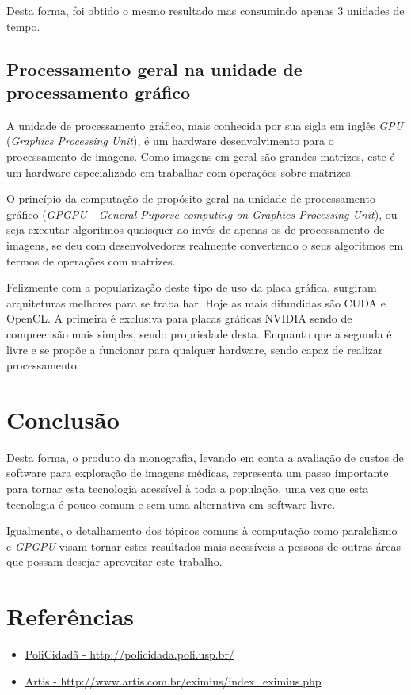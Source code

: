     Desta forma, foi obtido o mesmo resultado mas consumindo apenas 3 unidades de tempo.
  
  \subsection{Processamento geral na unidade de processamento gráfico}
  A unidade de processamento gráfico, mais conhecida por sua sigla em inglês \textit{GPU} (\textit{Graphics Processing Unit}), é um hardware desenvolvimento para o processamento de imagens. Como imagens em geral são grandes matrizes, este é um hardware especializado em trabalhar com operações sobre matrizes.
  
  O princípio da computação de propósito geral na unidade de processamento gráfico (\textit{GPGPU - General Puporse computing on Graphics Processing Unit}), ou seja executar algoritmos quaisquer ao invés de apenas os de processamento de imagens, se deu com desenvolvedores realmente convertendo o seus algoritmos em termos de operações com matrizes.
  
  Felizmente com a popularização deste tipo de uso da placa gráfica, surgiram arquiteturas melhores para se trabalhar. Hoje as mais difundidas são CUDA e OpenCL. A primeira é exclusiva para placas gráficas NVIDIA sendo de compreensão mais simples, sendo propriedade desta. Enquanto que a segunda é livre e se propõe a funcionar para qualquer hardware, sendo capaz de realizar processamento.

\section{Conclusão}
Desta forma, o produto da monografia, levando em conta a avaliação de custos de software para exploração de imagens médicas, representa um passo importante para tornar esta tecnologia acessível à toda a população, uma vez que esta tecnologia é pouco comum e sem uma alternativa em software livre.

Igualmente, o detalhamento dos tópicos comuns à computação como paralelismo e \textit{GPGPU} visam tornar estes resultados mais acessíveis a pessoas de outras áreas que possam desejar aproveitar este trabalho.

\section{Referências}
\begin{itemize}
  \item\label{policidada} \href{http://policidada.poli.usp.br/}{PoliCidadã - http://policidada.poli.usp.br/}
  \item\label{artis} \href{http://www.artis.com.br/eximius/index\_eximius.php}{Artis - http://www.artis.com.br/eximius/index\_eximius.php}
\end{itemize}
